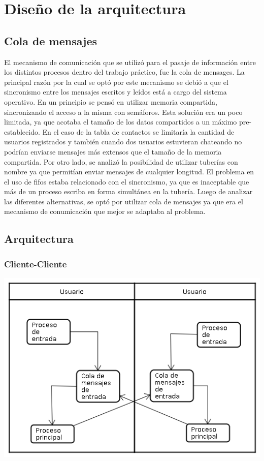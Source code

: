
\section{Diseño de la arquitectura}

\subsection{Cola de mensajes}
 
El mecanismo de comunicación que se utilizó para el pasaje de información entre
los distintos procesos dentro del trabajo práctico, fue la cola de mensages. La 
principal razón por la cual se optó por este mecanismo se debió a que el sincronismo
entre los mensajes escritos y leídos está a cargo del sistema operativo. En un 
principio se pensó en utilizar memoria compartida, sincronizando el acceso a la misma
con semáforos. Esta solución era un poco limitada, ya que acotaba el tamaño de los
datos compartidos a un máximo pre-establecido. En el caso de la tabla de contactos 
se limitaría la cantidad de usuarios registrados y también cuando dos usuarios estuvieran chateando
no podrían enviarse mensajes más extensos que el tamaño de la memoria compartida. Por
otro lado, se analizó la posibilidad de utilizar tuberías con nombre ya que permitían enviar mensajes
de cualquier longitud. El problema en el uso de fifos estaba relacionado con el sincronismo,
ya que es inaceptable que más de un proceso escriba en forma simultánea en la tubería.
Luego de analizar las diferentes alternativas, se optó por utilizar cola de mensajes
ya que era el mecanismo de conumicación que mejor se adaptaba al problema.

\subsection{Arquitectura}
\subsubsection{Cliente-Cliente}
\begin{center}
\small\includegraphics[scale=0.65]{./Images/ArquitecturaClienteConCliente}
\end{center}
